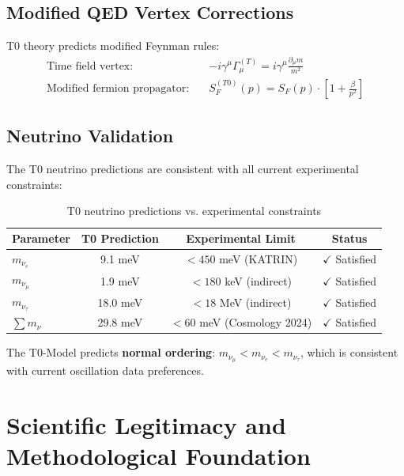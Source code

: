 	\subsection{Modified QED Vertex Corrections}
	\label{subsec:qed_corrections}
	
	T0 theory predicts modified Feynman rules:
	\begin{align}
		\text{Time field vertex:} \quad &-i\gamma^\mu\Gamma_\mu^{(T)} = i\gamma^\mu\frac{\partial_\mu m}{m^2} \\
		\text{Modified fermion propagator:} \quad &S_F^{(T0)}(p) = S_F(p) \cdot \left[1 + \frac{\beta}{p^2}\right]
	\end{align}
	
	\subsection{Neutrino Validation}
	\label{subsec:neutrino_validation}
	
	The T0 neutrino predictions are consistent with all current experimental constraints:
	
	\begin{table}[H]
		\centering
		\begin{tabular}{lccc}
			\toprule
			\textbf{Parameter} & \textbf{T0 Prediction} & \textbf{Experimental Limit} & \textbf{Status} \\
			\midrule
			$m_{\nu_e}$ & 9.1 meV & $< 450$ meV (KATRIN) & $\checkmark$ Satisfied \\
			$m_{\nu_\mu}$ & 1.9 meV & $< 180$ keV (indirect) & $\checkmark$ Satisfied \\
			$m_{\nu_\tau}$ & 18.0 meV & $< 18$ MeV (indirect) & $\checkmark$ Satisfied \\
			$\sum m_\nu$ & 29.8 meV & $< 60$ meV (Cosmology 2024) & $\checkmark$ Satisfied \\
			\bottomrule
		\end{tabular}
		\caption{T0 neutrino predictions vs. experimental constraints}
		\label{tab:neutrino_validation}
	\end{table}
	
	\begin{important}
		The T0-Model predicts \textbf{normal ordering}: $m_{\nu_\mu} < m_{\nu_e} < m_{\nu_\tau}$, which is consistent with current oscillation data preferences.
	\end{important}
	
	\section{Scientific Legitimacy and Methodological Foundation}
	\label{sec:scientific_legitimacy}
	
